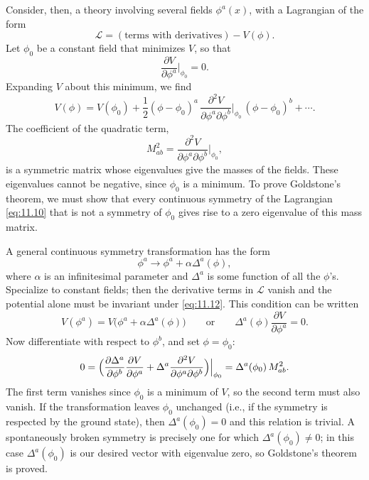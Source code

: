 Consider, then, a theory involving several fields $\phi^a(x)$, with a
Lagrangian of the form
\begin{equation}
  \mathcal{L} = (\text{terms with derivatives}) - V(\phi) .
  \label{eq:11.10}
\end{equation}
Let $\phi_0$ be a constant field that minimizes $V$, so that
\begin{equation}
  \frac{\partial V}{\partial\phi^a}\Big|_{\phi_0} = 0 .
\end{equation}
Expanding $V$ about this minimum, we find
\begin{equation}
  V(\phi) = V(\phi_0) + \frac{1}{2}(\phi-\phi_0)^a\,
    \frac{\partial^2 V}{\partial\phi^a\partial\phi^b}\Big|_{\phi_0}\,
    (\phi-\phi_0)^b + \cdots .
\end{equation}
The coefficient of the quadratic term,
\begin{equation}
  M^2_{ab} = \frac{\partial^2 V}{\partial\phi^a\partial\phi^b}\Big|_{\phi_0},
  \label{eq:11.11}
\end{equation}
is a symmetric matrix whose eigenvalues give the masses of the fields.  These
eigenvalues cannot be negative, since $\phi_0$ is a minimum.  To prove
Goldstone's theorem, we must show that every continuous symmetry of the
Lagrangian \eqref{eq:11.10} that is not a symmetry of $\phi_0$ gives rise to a
zero eigenvalue of this mass matrix.

A general continuous symmetry transformation has the form
\begin{equation}
  \phi^a \to \phi^a + \alpha\Delta^a(\phi),
  \label{eq:11.12}
\end{equation}
where $\alpha$ is an infinitesimal parameter and $\Delta^a$ is some function of
all the $\phi$'s.  Specialize to constant fields; then the derivative terms in
$\mathcal{L}$ vanish and the potential alone must be invariant under
\eqref{eq:11.12}.  This condition can be written
\begin{equation}
  V(\phi^a) = V\bigl( \phi^a + \alpha\Delta^a(\phi) \bigr)
  \qquad\text{or}\qquad
  \Delta^a(\phi)\frac{\partial V}{\partial\phi^a} = 0 .
\end{equation}
Now differentiate with respect to $\phi^b$, and set $\phi = \phi_0$:
\begin{equation}
  0 = \Bigl( \frac{\partial\Delta^a}{\partial\phi^b} \frac{\partial V}
    {\partial\phi^a} + \Delta^a \frac{\partial^2 V}{\partial\phi^a
      \partial\phi^b} \Bigr)\Big|_{\phi_0}
  = \Delta^a(\phi_0)\,M^2_{ab} .
  \label{eq:11.13}
\end{equation}
The first term vanishes since $\phi_0$ is a minimum of $V$, so the second term
must also vanish.  If the transformation leaves $\phi_0$ unchanged (i.e., if
the symmetry is respected by the ground state), then $\Delta^a(\phi_0) = 0$
and this relation is trivial.  A spontaneously broken symmetry is precisely
one for which $\Delta^a(\phi_0) \neq 0$; in this case $\Delta^a(\phi_0)$ is our
desired vector with eigenvalue zero, so Goldstone's theorem is proved.

